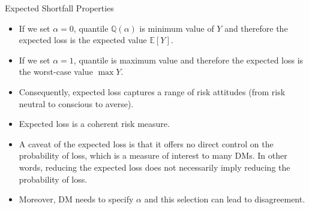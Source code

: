 \documentclass[9pt]{beamer}
\begin{document}
%
\begin{frame}{Expected Shortfall Properties}

\begin{itemize}

\item If we set $\alpha=0$, quantile $\mathbb{Q}(\alpha)$ is minimum value of $Y$ and therefore the expected loss is the expected value $\mathbb{E}[Y]$. 

\item If we set $\alpha=1$, quantile is maximum value and therefore the expected loss is the worst-case value $\max Y$.

\item Consequently, expected loss captures a range of risk attitudes (from risk neutral to conscious to averse).

\item Expected loss is a coherent risk measure. 

\item A caveat of the expected loss is that it offers no direct control on the probability of loss, which is a measure of interest to many DMs. In other words, reducing the expected loss does not necessarily imply reducing the probability of loss. 

\item Moreover, DM needs to specify $\alpha$ and this selection can lead to disagreement. 

\end{itemize}



\end{frame}
\end{document}
